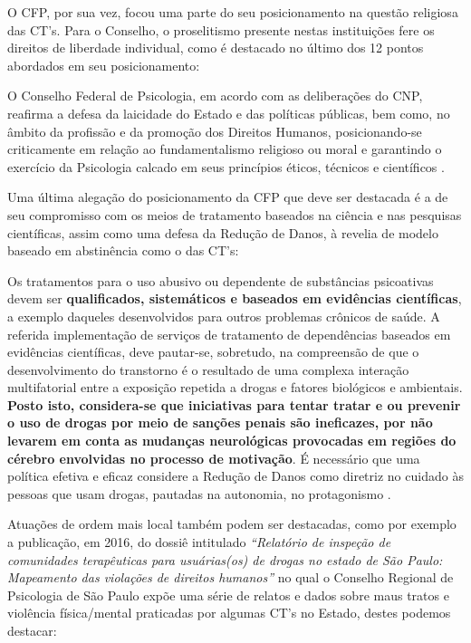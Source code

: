 \documentclass[
	12pt,				%
	oneside,			%
	a4paper,			%
	sumario=tradicional,
	english,			%
	brazil				%
	]{abntex2}
\begin{document}
O CFP, por sua vez, focou uma parte do seu posicionamento na questão religiosa das CT's. Para o Conselho, o proselitismo presente nestas instituições fere os direitos de liberdade individual, como é destacado no último dos 12 pontos abordados em seu posicionamento:
\begin{quoting}[rightmargin=0cm,leftmargin=4cm]
\begin{singlespace}
{\footnotesize
O Conselho Federal de Psicologia, em acordo com as deliberações do CNP, reafirma a defesa da laicidade do Estado e das políticas públicas, bem como, no âmbito da profissão e da promoção dos Direitos Humanos, posicionando-se criticamente em relação ao fundamentalismo religioso ou moral e garantindo o exercício da Psicologia calcado em seus princípios éticos, técnicos e científicos \cite[p. 04]{cfp2014}.}
\end{singlespace}
\end{quoting}
Uma última alegação do posicionamento da CFP que deve ser destacada é a de seu compromisso com os meios de tratamento baseados na ciência e nas pesquisas científicas, assim como uma defesa da Redução de Danos, à revelia de modelo baseado em abstinência como o das CT's:
\begin{quoting}[rightmargin=0cm,leftmargin=4cm]
\begin{singlespace}
{\footnotesize
Os tratamentos para o uso abusivo ou dependente de substâncias psicoativas devem ser \textbf{qualificados, sistemáticos e baseados em evidências científicas}, a exemplo daqueles desenvolvidos para outros problemas crônicos de saúde.
A referida implementação de serviços de tratamento de dependências baseados em evidências científicas, deve pautar-se, sobretudo, na compreensão de que o desenvolvimento do transtorno é o resultado de uma complexa interação multifatorial entre a exposição repetida a drogas e fatores biológicos e ambientais. \textbf{Posto isto, considera-se que iniciativas para tentar tratar e ou prevenir o uso de drogas por meio de sanções penais são ineficazes, por não levarem em conta as mudanças neurológicas provocadas em regiões do cérebro envolvidas no processo de motivação}. É necessário que uma política efetiva e eficaz considere a Redução de Danos como diretriz no cuidado às pessoas que usam drogas, pautadas na autonomia, no protagonismo \cite[pp. 03-04, grifo meu]{cfp2014}.}
\end{singlespace}
\end{quoting}
Atuações de ordem mais local também podem ser destacadas, como por exemplo a publicação, em 2016, do dossiê intitulado \emph{``Relatório de inspeção de comunidades terapêuticas para usuárias(os) de drogas no estado de São Paulo: Mapeamento das violações de direitos humanos''} no qual o Conselho Regional de Psicologia de São Paulo expõe uma série de relatos e dados sobre maus tratos e violência física/mental praticadas por algumas CT's no Estado, destes podemos destacar:
\end{document}
